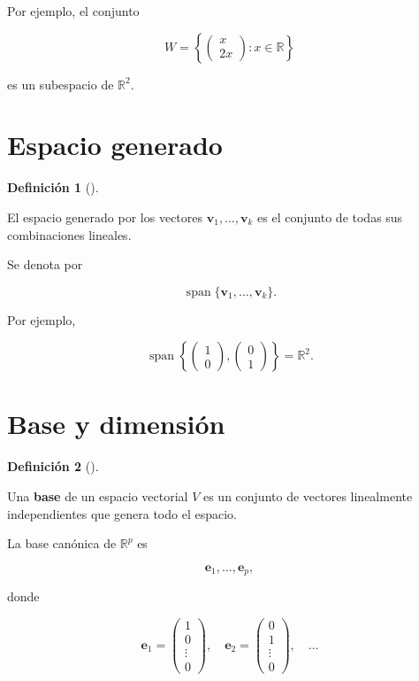 \documentclass[
  spanish,
  11pt,
  letterpaper,
  DIV=11,
  numbers=noendperiod]{scrreprt}
\theoremstyle{definition}
\newtheorem{definition}{Definición}[chapter]
\theoremstyle{plain}
\theoremstyle{definition}
\theoremstyle{remark}
\begin{document}
Por ejemplo, el conjunto

\[
W
=
\left\{
\begin{pmatrix}
x\\
2x
\end{pmatrix}
:
x\in\mathbb{R}
\right\}
\]

es un subespacio de \(\mathbb{R}^{2}\).

\section{Espacio generado}\label{espacio-generado}

\begin{definition}[]\protect\hypertarget{def-espacio-generado}{}\label{def-espacio-generado}

El espacio generado por los vectores
\(\mathbf{v}_1,\ldots,\mathbf{v}_k\) es el conjunto de todas sus
combinaciones lineales.

\end{definition}

Se denota por

\[
\operatorname{span}
\{\mathbf{v}_1,\ldots,\mathbf{v}_k\}.
\]

Por ejemplo,

\[
\operatorname{span}
\left\{
\begin{pmatrix}
1\\
0
\end{pmatrix},
\begin{pmatrix}
0\\
1
\end{pmatrix}
\right\}
=
\mathbb{R}^{2}.
\]

\section{Base y dimensión}\label{base-y-dimensiuxf3n}

\begin{definition}[]\protect\hypertarget{def-base}{}\label{def-base}

Una \textbf{base} de un espacio vectorial \(V\) es un conjunto de
vectores linealmente independientes que genera todo el espacio.

\end{definition}

La base canónica de \(\mathbb{R}^{p}\) es

\[
\mathbf{e}_1,\ldots,\mathbf{e}_p,
\]

donde

\[
\mathbf{e}_1=
\begin{pmatrix}
1\\
0\\
\vdots\\
0
\end{pmatrix},
\quad
\mathbf{e}_2=
\begin{pmatrix}
0\\
1\\
\vdots\\
0
\end{pmatrix},
\quad\ldots
\]
\end{document}
